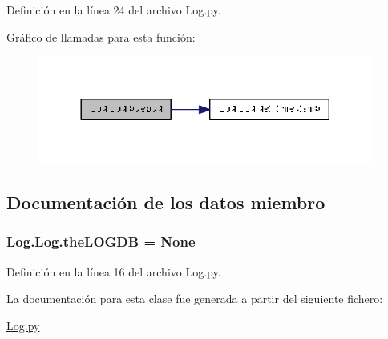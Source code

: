 Definición en la línea 24 del archivo Log.\-py.



Gráfico de llamadas para esta función\-:\nopagebreak
\begin{figure}[H]
\begin{center}
\leavevmode
\includegraphics[width=312pt]{class_log_1_1_log_a1ccee7bac0f543ece376f29ee51ac3ad_cgraph}
\end{center}
\end{figure}




\subsection{Documentación de los datos miembro}
\hypertarget{class_log_1_1_log_a9cf05fd2c1a24e2b2ef2da956fc1dd08}{
\subsubsection[{the\-L\-O\-G\-D\-B}]{\setlength{\rightskip}{0pt plus 5cm}Log.\-Log.\-the\-L\-O\-G\-D\-B = None\hspace{0.3cm}{\ttfamily [static]}}}\label{class_log_1_1_log_a9cf05fd2c1a24e2b2ef2da956fc1dd08}


Definición en la línea 16 del archivo Log.\-py.



La documentación para esta clase fue generada a partir del siguiente fichero\-:\begin{DoxyCompactItemize}
\item 
\hyperlink{_log_8py}{Log.\-py}\end{DoxyCompactItemize}
